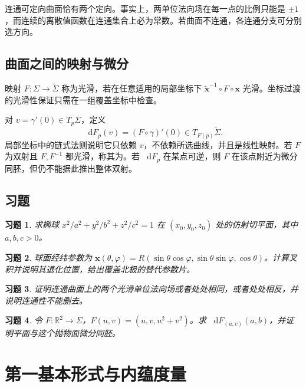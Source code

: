 \documentclass[UTF8,12pt,a4paper,fontset=fandol]{ctexbook}
\newcommand{\R}{\mathbb R}
\newcommand{\dd}{\mathop{}\!\mathrm d}
\newtheorem{exercise}{习题}[chapter]
\begin{document}
连通可定向曲面恰有两个定向。事实上，两单位法向场在每一点的比例只能是 $\pm1$，而连续的离散值函数在连通集合上必为常数。若曲面不连通，各连通分支可分别选方向。

\section{曲面之间的映射与微分}
映射 $F:\Sigma\to\widetilde\Sigma$ 称为光滑，若在任意适用的局部坐标下 $\widetilde{\mathbf x}^{-1}\circ F\circ\mathbf x$ 光滑。坐标过渡的光滑性保证只需在一组覆盖坐标中检查。

对 $v=\gamma'(0)\in T_p\Sigma$，定义
\[
 \dd F_p(v)=(F\circ\gamma)'(0)\in T_{F(p)}\widetilde\Sigma.
\]
局部坐标中的链式法则说明它只依赖 $v$，不依赖所选曲线，并且是线性映射。若 $F$ 为双射且 $F,F^{-1}$ 都光滑，称其为。若 $\dd F_p$ 在某点可逆，则 $F$ 在该点附近为微分同胚，但仍不能据此推出整体双射。

\section{习题}
\begin{exercise}\label{ex:dg-surfaces-tangent}
求椭球 $x^2/a^2+y^2/b^2+z^2/c^2=1$ 在 $(x_0,y_0,z_0)$ 处的仿射切平面，其中 $a,b,c>0$。
\end{exercise}
\begin{exercise}\label{ex:dg-surfaces-chart}
球面经纬参数为 $\mathbf x(\theta,\varphi)=R(\sin\theta\cos\varphi,\sin\theta\sin\varphi,\cos\theta)$。计算叉积并说明其退化位置，给出覆盖北极的替代参数片。
\end{exercise}
\begin{exercise}\label{ex:dg-surfaces-orientation}
证明连通曲面上的两个光滑单位法向场或者处处相同，或者处处相反，并说明连通性不能删去。
\end{exercise}
\begin{exercise}\label{ex:dg-surfaces-differential}
令 $F:\R^2\to\Sigma$，$F(u,v)=(u,v,u^2+v^2)$。求 $\dd F_{(u,v)}(a,b)$，并证明平面与这个抛物面微分同胚。
\end{exercise}

\chapter{第一基本形式与内蕴度量}
\label{chap:dg-metric}
\end{document}
